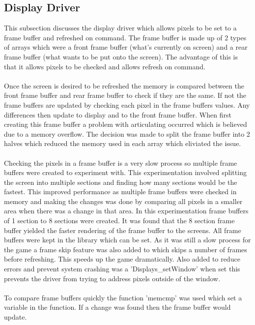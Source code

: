 \documentclass[a4paper,12pt]{article}
\begin{document}
\subsection{Display Driver}
\begin{flushleft}
This subsection discusses the display driver which allows pixels to be set to a frame buffer and refreshed on command. The frame buffer is made up of 2 types of arrays which were a front frame buffer (what's currently on screen) and a rear frame buffer (what wants to be put onto the screen). The advantage of this is that it allows pixels to be checked and allows refresh on command. 
\\ \- \\
 Once the screen is desired to be refreshed the memory is compared between the front frame buffer and rear frame buffer to check if they are the same. If not the frame buffers are updated by checking each pixel in the frame buffers values. Any differences then update to display and to the front frame buffer. When first creating this frame buffer a problem with articulating occurred which is believed due to a memory overflow. The decision was made to split the frame buffer into 2 halves which reduced the memory used in each array which eliviated the issue. \\ \- \\
Checking the pixels in a frame buffer is a very slow process so multiple frame buffers were created to experiment with. This experimentation involved splitting the screen into multiple sections and finding how many sections would be the fastest. This improved performance as multiple frame buffers were checked in memory and making the changes was done by comparing all pixels in a smaller area when there was a change in that area. In this experimentation frame buffers of 1 section to 8 sections were created. It was found that the 8 section frame buffer yielded the faster rendering of the frame buffer to the screens. All frame buffers were kept in the library which can be set. As it was still a slow process for the game a frame skip feature was also added to which skips a number of frames before refreshing. This speeds up the game dramatically. Also added to reduce errors and prevent system crashing was a 'Displays\_setWindow' when set this prevents the driver from trying to address pixels outside of the window.
\\ \- \\
To compare frame buffers quickly the function 'memcmp' was used which set a variable in the function. If a change was found then the frame buffer would update.

\end{flushleft}
\end{document}
